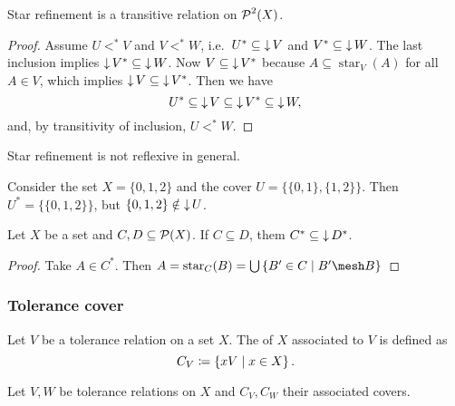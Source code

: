 \begin{lemma}
Star refinement is a transitive relation on $\operatorname{\mathcal{P}}^2(X)$.
\end{lemma}
\begin{proof}
Assume $U <^* V$ and $V<^* W$, i.e.\ $U^* \subseteq \operatorname{\downarrow} V$ and $V^* \subseteq \operatorname{\downarrow} W$. The last inclusion implies $\operatorname{\downarrow} V^* \subseteq \operatorname{\downarrow} W$. Now $V\subseteq \operatorname{\downarrow} V^*$ because $A\subseteq \operatorname{star}_V(A)$ for all $A\in V$, which implies $\operatorname{\downarrow} V\subseteq \operatorname{\downarrow} V^*$. Then we have
\[ U^* \subseteq \operatorname{\downarrow} V \subseteq \operatorname{\downarrow} V^* \subseteq \operatorname{\downarrow} W, \]
and, by transitivity of inclusion, $U <^* W$.
\end{proof}

\begin{example}
Star refinement is not reflexive in general. 

Consider the set $X = \{0,1,2\}$ and the cover $U = \big\{\{0,1\}, \{1,2\}\big\}$. Then $U^* = \big\{\{0,1,2\}\big\}$, but $\{0,1,2\}\notin \operatorname{\downarrow} U$.
\end{example}

\begin{lemma}
Let $X$ be a set and $C,D\subseteq \operatorname{\mathcal{P}}(X)$. If $C\subseteq D$, them $C^*\subseteq \operatorname{\downarrow} D^*$.
\end{lemma}
\begin{proof}
Take $A \in C^*$. Then $A = \operatorname{star}_C(B) = \bigcup \setbuilder{B'\in C}{B'\mesh B}$
\end{proof}

\subsubsection{Tolerance cover}
\begin{definition}
Let $V$ be a tolerance relation on a set $X$. The  of $X$ associated to $V$ is defined as
\[ C_V \coloneqq \left\{ xV \;\middle|\; x\in X \right\}. \]
\end{definition}

\begin{lemma}
Let $V, W$ be tolerance relations on $X$ and $C_V, C_W$ their associated covers.
\end{lemma}

